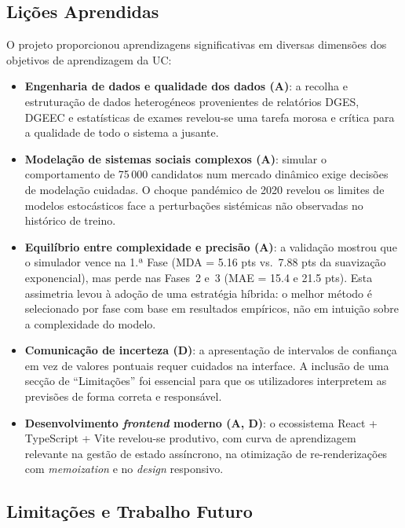 \documentclass[12pt,a4paper]{article}
\begin{document}
\subsection{Lições Aprendidas}

O projeto proporcionou aprendizagens significativas em diversas dimensões dos objetivos de aprendizagem da UC:

\begin{itemize}
  \item \textbf{Engenharia de dados e qualidade dos dados (A)}: a recolha e estruturação de dados heterogéneos provenientes de relatórios DGES, DGEEC e estatísticas de exames revelou-se uma tarefa morosa e crítica para a qualidade de todo o sistema a jusante.

  \item \textbf{Modelação de sistemas sociais complexos (A)}: simular o comportamento de 75\,000 candidatos num mercado dinâmico exige decisões de modelação cuidadas. O choque pandémico de 2020 revelou os limites de modelos estocásticos face a perturbações sistémicas não observadas no histórico de treino.

  \item \textbf{Equilíbrio entre complexidade e precisão (A)}: a validação mostrou que o simulador vence na 1.ª Fase (MDA = 5.16 pts vs.\ 7.88 pts da suavização exponencial), mas perde nas Fases~2 e~3 (MAE = 15.4 e 21.5 pts). Esta assimetria levou à adoção de uma estratégia híbrida: o melhor método é selecionado por fase com base em resultados empíricos, não em intuição sobre a complexidade do modelo.

  \item \textbf{Comunicação de incerteza (D)}: a apresentação de intervalos de confiança em vez de valores pontuais requer cuidados na interface. A inclusão de uma secção de ``Limitações'' foi essencial para que os utilizadores interpretem as previsões de forma correta e responsável.

  \item \textbf{Desenvolvimento \textit{frontend} moderno (A, D)}: o ecossistema React + TypeScript + Vite revelou-se produtivo, com curva de aprendizagem relevante na gestão de estado assíncrono, na otimização de re-renderizações com \textit{memoization} e no \textit{design} responsivo.
\end{itemize}

\subsection{Limitações e Trabalho Futuro}
\end{document}
